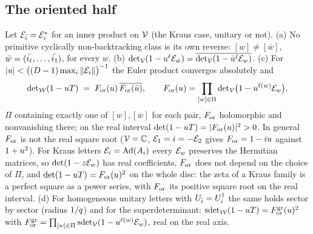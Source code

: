 \subsection{The oriented half}

\begin{proposition}
\label{prop:oriented-half}
Let $\mathcal E_{\bar{i}} = \mathcal E_{i}^*$ for an inner product on $\mathcal V$ (the Kraus case, unitary or not).
(a) No primitive cyclically non-backtracking class is its own reverse: $[w]\ne[\bar w]$, $\bar w =
(\bar{i_{\ell}},\dots,\bar{i_1})$, for every $w$.
(b) $\det_{\mathcal V}(1-u^{\ell}\mathcal E_{\bar w}) = \overline{\det_{\mathcal V}(1-\bar{u}^{\ell}\mathcal E_{w})}$.
(c) For $|u| < \bigl((D-1)\max_i\|\mathcal E_{i}\|\bigr)^{-1}$ the Euler product converges absolutely and
\[
  \det\nolimits_{\mathcal W}(1-uT) \;=\; F_{\mathrm{or}}(u)\,\overline{F_{\mathrm{or}}(\bar{u})},\qquad
  F_{\mathrm{or}}(u) = \prod_{[w]\in\Pi}\det\nolimits_{\mathcal V}\bigl(1-u^{\ell(w)}\mathcal E_{w}\bigr),
\]
$\Pi$ containing exactly one of $[w],[\bar w]$ for each pair, $F_{\mathrm{or}}$ holomorphic and nonvanishing there;
on the real interval $\det(1-uT) = |F_{\mathrm{or}}(u)|^2 > 0$. In general $F_{\mathrm{or}}$ is not the real square
root ($\mathcal V = \mathbb C$, $\mathcal E_{1} = i = -\mathcal E_{2}$ gives $F_{\mathrm{or}} = 1-iu$ against $1+u^2$). For Kraus
letters $\mathcal E_{i} = \operatorname{Ad}(A_{i})$ every $\mathcal E_{w}$ preserves the Hermitian matrices, so
$\det(1-z\mathcal E_{w})$ has real coefficients, $F_{\mathrm{or}}$ does not depend on the choice of $\Pi$, and
$\det(1-uT) = F_{\mathrm{or}}(u)^2$ on the whole disc: the zeta of a Kraus family is a perfect square as a
power series, with $F_{\mathrm{or}}$ its positive square root on the real interval.
(d) For homogeneous unitary letters with $U_{\bar{i}} = U_{i}^\dagger$ the same holds sector by sector
(radius $1/q$) and for the superdeterminant: $\operatorname{sdet}_{\mathcal W}(1-uT) = F_{\mathrm{or}}^{\mathrm{gr}}(u)^2$
with $F_{\mathrm{or}}^{\mathrm{gr}} = \prod_{[w]\in\Pi}\operatorname{sdet}_{\mathcal V}(1-u^{\ell(w)}\mathcal E_{w})$, real on the real axis.
\end{proposition}

